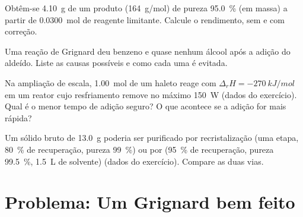 \begin{exercise}[$\star\star$]\label{exo:b2:lab-techniques-2:9}
Obtêm-se \qty{4.10}{g} de um produto (\qty{164}{g/mol}) de pureza 95.0~\% (em massa) a partir de \qty{0.0300}{mol}
de reagente limitante. Calcule o rendimento, sem e com correção.
\end{exercise}

\begin{exercise}[$\star\star\star$]\label{exo:b2:lab-techniques-2:10}
Uma reação de Grignard deu benzeno e quase nenhum álcool após a adição do aldeído. Liste as causas
possíveis e como cada uma é evitada.
\end{exercise}

\begin{exercise}[$\star\star\star$]\label{exo:b2:lab-techniques-2:11}
Na ampliação de escala, \qty{1.00}{mol} de um haleto reage com $\Delta_rH = \qty{-270}{kJ/mol}$ em um
reator cujo resfriamento remove no máximo \qty{150}{W} (dados do exercício). Qual é o menor tempo de
adição seguro? O que acontece se a adição for mais rápida?
\end{exercise}

\begin{exercise}[$\star\star\star$]\label{exo:b2:lab-techniques-2:12}
Um sólido bruto de \qty{13.0}{g} poderia ser purificado por recristalização (uma etapa, 80~\% de
recuperação, pureza 99~\%) ou por  (95~\% de recuperação, pureza 99.5~\%, \qty{1.5}{L}
de solvente) (dados do exercício). Compare as duas vias.
\end{exercise}

\section{Problema: Um Grignard bem feito}

